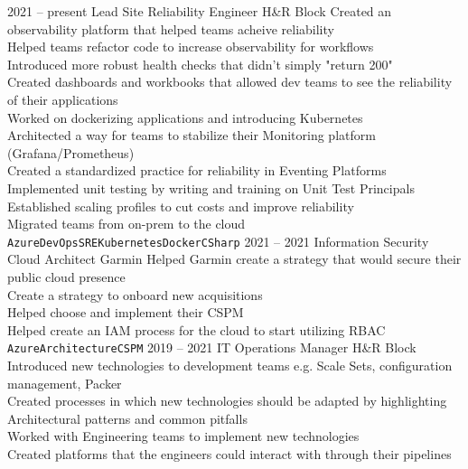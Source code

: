 \documentclass[9pt]{developercv} %
\begin{document}
\begin{entrylist}
	\entry
		{2021 -- present}
		{Lead Site Reliability Engineer}
		{H\&R Block}
		{Created an observability platform that helped teams acheive reliability \\
		Helped teams refactor code to increase observability for workflows \\
		Introduced more robust health checks that didn't simply "return 200" \\
		Created dashboards and workbooks that allowed dev teams to see the reliability of their applications \\
		Worked on dockerizing applications and introducing Kubernetes \\
		Architected a way for teams to stabilize their Monitoring platform (Grafana/Prometheus)\\
		Created a standardized practice for reliability in Eventing Platforms \\
		Implemented unit testing by writing and training on Unit Test Principals \\
		Established scaling profiles to cut costs and improve reliability \\
		Migrated teams from on-prem to the cloud \\
		\texttt{Azure}\slashsep\texttt{DevOps}\slashsep\texttt{SRE}\slashsep\texttt{Kubernetes}\slashsep\texttt{Docker}\slashsep\texttt{CSharp}}
	\entry
		{2021 -- 2021}
		{Information Security Cloud Architect}
		{Garmin}
		{Helped Garmin create a strategy that would secure their public cloud presence\\ 
		Create a strategy to onboard new acquisitions \\
		Helped choose and implement their CSPM \\
		Helped create an IAM process for the cloud to start utilizing RBAC \\
		\texttt{Azure}\slashsep\texttt{Architecture}\slashsep\texttt{CSPM}}
	\entry
		{2019 -- 2021}
		{IT Operations Manager}
		{H\&R Block}
		{Introduced new technologies to development teams e.g. Scale Sets, configuration management, Packer \\
		Created processes in which new technologies should be adapted by highlighting Architectural patterns and common pitfalls \\
		Worked with Engineering teams to implement new technologies \\
		Created platforms that the engineers could interact with through their pipelines \\
}
\end{entrylist}
\end{document}
